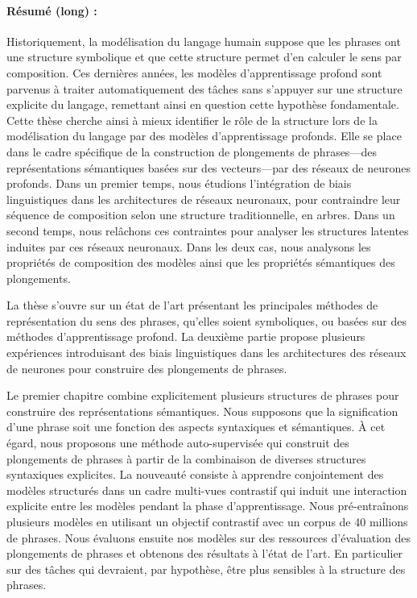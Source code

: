 \paragraph{Résumé (long) :} Historiquement, la modélisation du langage humain suppose que les phrases ont une structure symbolique et que cette structure permet d’en calculer le sens par composition. Ces dernières années, les modèles d’apprentissage profond sont parvenus à traiter automatiquement des tâches sans s’appuyer sur une structure explicite du langage, remettant ainsi en question cette hypothèse fondamentale. Cette thèse cherche ainsi à mieux identifier le rôle de la structure lors de la modélisation du langage par des modèles d’apprentissage profonds. Elle se place dans le cadre spécifique de la construction de plongements de phrases—des représentations sémantiques basées sur des vecteurs—par des réseaux de neurones profonds. Dans un premier temps, nous étudions l’intégration de biais linguistiques dans les architectures de réseaux neuronaux, pour contraindre leur séquence de composition selon une structure traditionnelle, en arbres. Dans un second temps, nous relâchons ces contraintes pour analyser les structures latentes induites par ces réseaux neuronaux. Dans les deux cas, nous analysons les propriétés de composition des modèles ainsi que les propriétés sémantiques des plongements. 

La thèse s’ouvre sur un état de l’art présentant les principales méthodes de représentation du sens des phrases, qu’elles soient symboliques, ou basées sur des méthodes d’apprentissage profond. La deuxième partie propose plusieurs expériences introduisant des biais linguistiques dans les architectures des réseaux de neurones pour construire des plongements de phrases. 

Le premier chapitre combine explicitement plusieurs structures de phrases pour construire des représentations sémantiques. Nous supposons que la signification d'une phrase soit une fonction des aspects syntaxiques et sémantiques. À cet égard, nous proposons une méthode auto-supervisée qui construit des plongements de phrases à partir de la combinaison de diverses structures syntaxiques explicites. La nouveauté consiste à apprendre conjointement des modèles structurés dans un cadre multi-vues contrastif qui induit une interaction explicite entre les modèles pendant la phase d'apprentissage. Nous pré-entraînons plusieurs modèles en utilisant un objectif contrastif avec un corpus de 40 millions de phrases. Nous évaluons ensuite nos modèles sur des ressources d’évaluation des plongements de phrases et obtenons des résultats à l’état de l’art. En particulier sur des tâches qui devraient, par hypothèse, être plus sensibles à la structure des phrases. 

